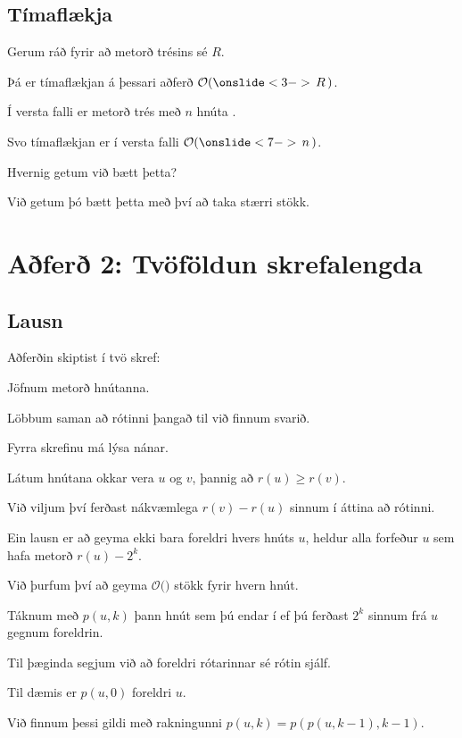 \subsection{Tímaflækja}
{
    {
        \item<1-> Gerum ráð fyrir að metorð trésins sé $R$.
        \item<2-> Þá er tímaflækjan á þessari aðferð $\mathcal{O}(\onslide<3->{\,R\,})$.
        \item<4-> Í versta falli er metorð trés með $n$ hnúta .
        \item<6-> Svo tímaflækjan er í versta falli $\mathcal{O}(\onslide<7->{\,n\,})$.
        \item<8-> Hvernig getum við bætt þetta?
        \item<9-> Við getum þó bætt þetta með því að taka stærri stökk.
    }
}

\section{Aðferð 2: Tvöföldun skrefalengda}
\subsection{Lausn}
{
    {
        \item<1-> Aðferðin skiptist í tvö skref:
        {
            \item<2-> Jöfnum metorð hnútanna.
            \item<3-> Löbbum saman að rótinni þangað til við finnum svarið.
        }
        \item<4-> Fyrra skrefinu má lýsa nánar.
        \item<5-> Látum hnútana okkar vera $u$ og $v$, þannig að $r(u) \geq r(v)$.
        \item<6-> Við viljum því ferðast nákvæmlega $r(v) - r(u)$ sinnum í áttina að rótinni.
        \item<7-> Ein lausn er að geyma ekki bara foreldri hvers hnúts $u$,
            heldur alla forfeður $u$ sem hafa metorð $r(u) - 2^k$.
        \item<8-> Við þurfum því að geyma $\mathcal{O}($$)$ stökk fyrir hvern hnút.
        \item<10-> Táknum með $p(u, k)$ þann hnút sem þú endar í ef þú ferðast $2^k$ sinnum frá $u$ gegnum foreldrin.
        \item<11-> Til þæginda segjum við að foreldri rótarinnar sé rótin sjálf.
        \item<12-> Til dæmis er $p(u, 0)$ foreldri $u$.
        \item<13-> Við finnum þessi gildi með rakningunni $p(u, k) = p(p(u, k - 1), k - 1)$.
    }
}

